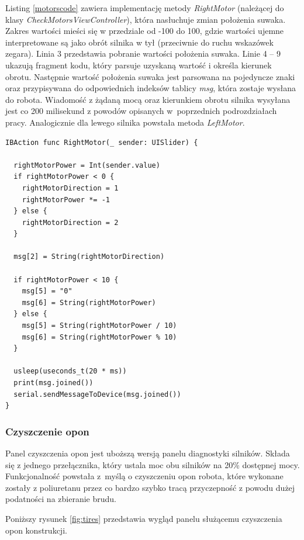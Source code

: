 Listing \ref{motorscode} zawiera implementację metody \textit{RightMotor} (należącej do klasy \textit{CheckMotorsViewController}), która nasłuchuje zmian położenia suwaka. Zakres wartości mieści się w przedziale od -100 do 100, gdzie wartości ujemne interpretowane są jako obrót silnika w tył (przeciwnie do ruchu wskazówek zegara). Linia 3 przedstawia pobranie wartości położenia suwaka. Linie 4 – 9 ukazują fragment kodu, który parsuje uzyskaną wartość i określa kierunek obrotu. Następnie wartość położenia suwaka jest parsowana na pojedyncze znaki oraz przypisywana do odpowiednich indeksów tablicy \textit{msg}, która zostaje wysłana do robota. Wiadomość z żądaną mocą oraz kierunkiem obrotu silnika wysyłana jest co 200 milisekund z powodów opisanych w~poprzednich podrozdziałach pracy. Analogicznie dla lewego silnika powstała metoda \textit{LeftMotor}.

\begin{minipage}{\textwidth}
	\begin{lstlisting}[label=motorscode,caption=Nasłuchiwanie zmiany położenia suwaka.]
IBAction func RightMotor(_ sender: UISlider) {
  
  rightMotorPower = Int(sender.value)
  if rightMotorPower < 0 {
    rightMotorDirection = 1
    rightMotorPower *= -1
  } else {
    rightMotorDirection = 2
  }
    
  msg[2] = String(rightMotorDirection)
    
  if rightMotorPower < 10 {
    msg[5] = "0"
    msg[6] = String(rightMotorPower)
  } else {
    msg[5] = String(rightMotorPower / 10)
    msg[6] = String(rightMotorPower % 10)
  }
    
  usleep(useconds_t(20 * ms))
  print(msg.joined())
  serial.sendMessageToDevice(msg.joined())
}
	\end{lstlisting}
\end{minipage}

\subsubsection{Czyszczenie opon}
Panel czyszczenia opon jest uboższą wersją panelu diagnostyki silników. Składa się z jednego przełącznika, który ustala moc obu silników na 20\% dostępnej mocy. Funkcjonalność powstała z~myślą o czyszczeniu opon robota, które wykonane zostały z poliuretanu przez co bardzo szybko tracą przyczepność z powodu dużej podatności na zbieranie brudu.

\newpage

Poniższy rysunek \ref{fig:tires} przedstawia wygląd panelu służącemu czyszczenia opon konstrukcji.

